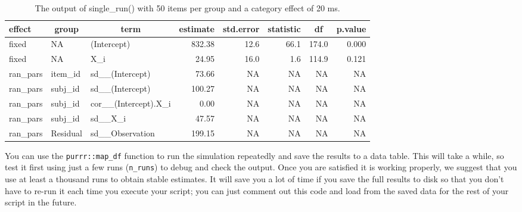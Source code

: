 \documentclass[
  english,
  doc,floatsintext]{apa6}
\begin{document}
\begin{table}[H]

\begin{center}
\begin{threeparttable}

\caption{\label{tab:singrun-new}The output of single\_run() with 50 items per group and a category effect of 20 ms.}

\small{

\begin{tabular}{lllrrrrr}
\toprule
effect & \multicolumn{1}{c}{group} & \multicolumn{1}{c}{term} & \multicolumn{1}{c}{estimate} & \multicolumn{1}{c}{std.error} & \multicolumn{1}{c}{statistic} & \multicolumn{1}{c}{df} & \multicolumn{1}{c}{p.value}\\
\midrule
fixed & NA & (Intercept) & 832.38 & 12.6 & 66.1 & 174.0 & 0.000\\
fixed & NA & X\_i & 24.95 & 16.0 & 1.6 & 114.9 & 0.121\\
ran\_pars & item\_id & sd\_\_(Intercept) & 73.66 & NA & NA & NA & NA\\
ran\_pars & subj\_id & sd\_\_(Intercept) & 100.27 & NA & NA & NA & NA\\
ran\_pars & subj\_id & cor\_\_(Intercept).X\_i & 0.00 & NA & NA & NA & NA\\
ran\_pars & subj\_id & sd\_\_X\_i & 47.57 & NA & NA & NA & NA\\
ran\_pars & Residual & sd\_\_Observation & 199.15 & NA & NA & NA & NA\\
\bottomrule
\end{tabular}

}

\end{threeparttable}
\end{center}

\end{table}

You can use the \texttt{purrr::map\_df} function to run the simulation repeatedly and save the results to a data table. This will take a while, so test it first using just a few runs (\texttt{n\_runs}) to debug and check the output. Once you are satisfied it is working properly, we suggest that you use at least a thousand runs to obtain stable estimates. It will save you a lot of time if you save the full results to disk so that you don't have to re-run it each time you execute your script; you can just comment out this code and load from the saved data for the rest of your script in the future.
\end{document}

